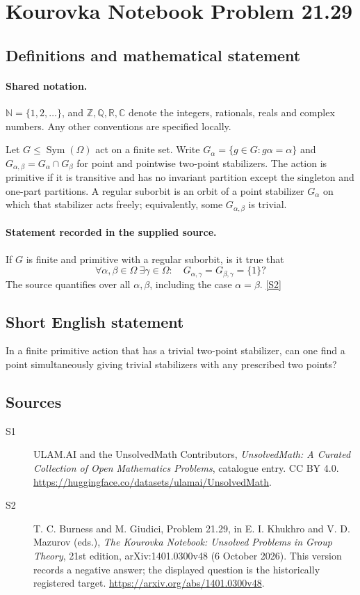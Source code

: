 \documentclass[11pt]{article}
\newcommand{\sref}[2]{\hyperlink{source:#1:#2}{[S#2]}}
\begin{document}
\section{Kourovka Notebook Problem 21.29}\label{statement}

\subsection{Definitions and mathematical statement}

\paragraph{Shared notation.}$\mathbb N=\{1,2,\ldots\}$, and $\mathbb Z,\mathbb Q,\mathbb R,\mathbb C$ denote the integers, rationals, reals and complex numbers. Any other conventions are specified locally.


Let $G\leq\operatorname{Sym}(\Omega)$ act on a finite set. Write $G_\alpha=\{g\in G:g\alpha=\alpha\}$ and $G_{\alpha,\beta}=G_\alpha\cap G_\beta$ for point and pointwise two-point stabilizers. The action is primitive if it is transitive and has no invariant partition except the singleton and one-part partitions. A regular suborbit is an orbit of a point stabilizer $G_\alpha$ on which that stabilizer acts freely; equivalently, some $G_{\alpha,\beta}$ is trivial.
\paragraph{Statement recorded in the supplied source.}
If $G$ is finite and primitive with a regular suborbit, is it true that
\[
 \forall\alpha,\beta\in\Omega\ \exists\gamma\in\Omega:\quad
 G_{\alpha,\gamma}=G_{\beta,\gamma}=\{1\}?
\]
The source quantifies over all $\alpha,\beta$, including the case $\alpha=\beta$. \sref{statement}{2}
\subsection{Short English statement}
In a finite primitive action that has a trivial two-point stabilizer, can one find a point simultaneously giving trivial stabilizers with any prescribed two points?
\subsection{Sources}
\begin{description}
\item[\hypertarget{source:statement:1}{S1}] ULAM.AI and the UnsolvedMath Contributors, \emph{UnsolvedMath: A Curated Collection of Open Mathematics Problems}, catalogue entry. CC BY 4.0. \url{https://huggingface.co/datasets/ulamai/UnsolvedMath}.
\item[\hypertarget{source:statement:2}{S2}] T. C. Burness and M. Giudici, Problem 21.29, in E. I. Khukhro and V. D. Mazurov (eds.), \emph{The Kourovka Notebook: Unsolved Problems in Group Theory}, 21st edition, arXiv:1401.0300v48 (6 October 2026). This version records a negative answer; the displayed question is the historically registered target. \url{https://arxiv.org/abs/1401.0300v48}.
\end{description}
\label{end:statement}
\end{document}
